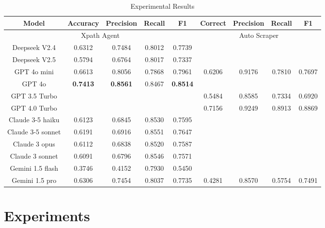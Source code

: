 \documentclass[a4paper]{article}
\begin{document}
\begin{table}[h]
  \centering
    \begin{tabular}{|c|c|c|c|c|c|c|c|c|}
    \hline
    \textbf{Model} & \textbf{Accuracy} & \textbf{Precision} & \textbf{Recall} & \textbf{F1} & \textbf{Correct} & \textbf{Precision} & \textbf{Recall} & \textbf{F1}\\ \hline
    \multicolumn{5}{|c|}{\cellcolor{yellow!30}Xpath Agent} & \multicolumn{4}{|c|}{\cellcolor{cyan!20} Auto Scraper}\\ \hline
    Deepseek V2.4       & 0.6312 & 0.7484 & 0.8012 & 0.7739       & & & & \\
    Deepseek V2.5       & 0.5794 & 0.6764 & 0.8017 & 0.7337       & & & & \\
    GPT 4o mini         & 0.6613 & 0.8056 & 0.7868 & 0.7961       & 0.6206 & 0.9176 & 0.7810 & 0.7697 \\
    GPT 4o              &\textbf{0.7413} &\textbf{0.8561} &0.8467 &\textbf{0.8514}            & & & & \\
    GPT 3.5 Turbo       & & & &                                   & 0.5484 & 0.8585 & 0.7334 & 0.6920 \\
    GPT 4.0 Turbo       & & & &                                   & 0.7156 & 0.9249 & 0.8913 & 0.8869 \\
    Claude 3-5 haiku    & 0.6123 & 0.6845 & 0.8530 & 0.7595       & & & & \\
    Claude 3-5 sonnet   & 0.6191 & 0.6916 & 0.8551 & 0.7647       & & & & \\
    Claude 3 opus       & 0.6112 & 0.6838 & 0.8520 & 0.7587       & & & & \\
    Claude 3 sonnet     & 0.6091 & 0.6796 & 0.8546 & 0.7571       & & & & \\
    Gemini 1.5 flash    & 0.3746 & 0.4152 & 0.7930 & 0.5450       & & & & \\
    Gemini 1.5 pro      & 0.6306 & 0.7454 & 0.8037 & 0.7735       & 0.4281 & 0.8570 & 0.5754 & 0.7491 \\

    \hline
    \end{tabular}

  \caption{Experimental Results}
\end{table}

\section{Experiments }
\end{document}

